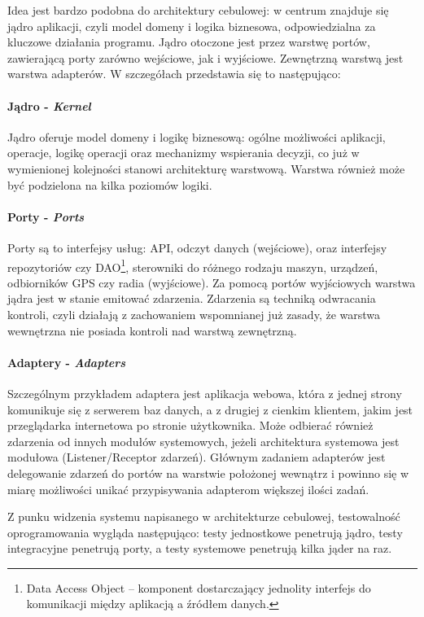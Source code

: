 Idea jest bardzo podobna do architektury cebulowej: w centrum znajduje się jądro aplikacji, czyli model domeny i logika biznesowa, odpowiedzialna za kluczowe działania programu. Jądro otoczone jest przez warstwę portów, zawierającą porty zarówno wejściowe, jak i wyjściowe. Zewnętrzną warstwą jest warstwa adapterów. W szczegółach przedstawia się to następująco:

\paragraph{Jądro - \textit{Kernel}}
Jądro oferuje model domeny i logikę biznesową: ogólne możliwości aplikacji, operacje, logikę operacji oraz mechanizmy wspierania decyzji, co już w wymienionej kolejności stanowi architekturę warstwową. Warstwa również może być podzielona na kilka poziomów logiki. 

\paragraph{Porty - \textit{Ports}}
Porty są to interfejsy usług: API, odczyt danych (wejściowe), oraz interfejsy repozytoriów czy DAO\footnote{Data Access Object – komponent dostarczający jednolity interfejs do komunikacji między aplikacją a źródłem danych.}, sterowniki do różnego rodzaju maszyn, urządzeń, odbiorników GPS czy radia (wyjściowe). Za pomocą portów wyjściowych warstwa jądra jest w stanie emitować zdarzenia. Zdarzenia są techniką odwracania kontroli, czyli działają z zachowaniem wspomnianej już zasady, że warstwa wewnętrzna nie posiada kontroli nad warstwą zewnętrzną. 

\paragraph{Adaptery - \textit{Adapters}}
Szczególnym przykładem adaptera jest aplikacja webowa, która z jednej strony komunikuje się z serwerem baz danych, a z drugiej z cienkim klientem, jakim jest przeglądarka internetowa po stronie użytkownika. Może odbierać również zdarzenia od innych modułów systemowych, jeżeli architektura systemowa jest modułowa (Listener/Receptor zdarzeń). Głównym zadaniem adapterów jest delegowanie zdarzeń do portów na warstwie położonej wewnątrz i powinno się w miarę możliwości unikać przypisywania adapterom większej ilości zadań.

Z punku widzenia systemu napisanego w architekturze cebulowej, testowalność oprogramowania wygląda następująco: testy jednostkowe penetrują jądro, testy integracyjne penetrują porty, a testy systemowe penetrują kilka jąder na raz.

